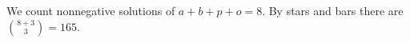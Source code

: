 We count nonnegative solutions of $a+b+p+o=8$. By stars and bars there are $\binom{8+3}{3}=\boxed{165}$.

